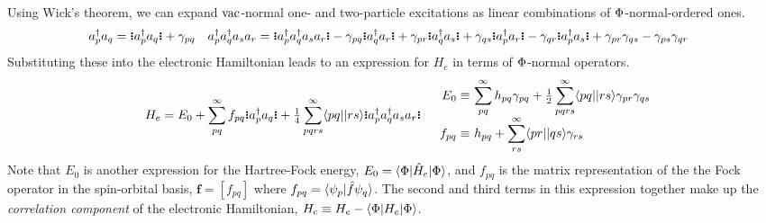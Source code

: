 \documentclass[11pt]{article}
\numberwithin{equation}{section}
\begin{document}
\begin{dfn}
Using Wick's theorem, we can expand $\mathrm{vac}$-normal one- and two-particle excitations as linear combinations of $\Phi $-normal-ordered ones.
\begin{align}
&
  a_p\dg a_q
=
  \gno{a_p\dg a_q}
+
  \g_{pq}
&&
  a_p\dg a_q\dg a_sa_r
=
  \gno{a_p\dg a_q\dg a_sa_r}
-
  \g_{pq}\gno{a_q\dg a_r}
+
  \g_{pr}\gno{a_q\dg a_s}
+
  \g_{qs}\gno{a_p\dg a_r}
-
  \g_{qr}\gno{a_p\dg a_s}
+
  \g_{pr}\g_{qs}
-
  \g_{ps}\g_{qr}
\end{align}
Substituting these into the electronic Hamiltonian leads to an expression for $H_e$ in terms of $\Phi $-normal operators.
\begin{align}
&&
  H_e
=
  E_0
+
  \sum_{pq}^\infty
  f_{pq}
  \gno{a_p\dg a_q}
+
  \tfr{1}{4}
  \sum_{pqrs}^\infty
  \ip{pq||rs}
  \gno{a_p\dg a_q\dg a_sa_r}
&&
\begin{array}{r@{\ }l}
  E_0
\equiv&
\ds{
  \sum_{pq}^\infty
  h_{pq}\g_{pq}
+
  \tfr{1}{2}
  \sum_{pqrs}^\infty
  \ip{pq||rs}
  \g_{pr}\g_{qs}
}
\\[5pt]
  f_{pq}
\equiv&
  h_{pq}
+
  \ds{\sum_{rs}^{\infty}}
  \ip{pr||qs}
  \g_{rs}
\end{array}
\end{align}
Note that $E_0$ is another expression for the Hartree-Fock energy, $E_0=\langle\Phi |\hat{H}_e|\Phi \rangle$, and $f_{pq}$ is the matrix representation of the the Fock operator in the spin-orbital basis, $\bm{f}=[f_{pq}]$ where $f_{pq}=\langle\psi _p|\hat{f}\psi _q\rangle$.
The second and third terms in this expression together make up the \textit{correlation component} of the electronic Hamiltonian, $H_{\mathrm{c}}\equiv H_e - \langle\Phi |H_e|\Phi \rangle$.
\end{dfn}
\end{document}
